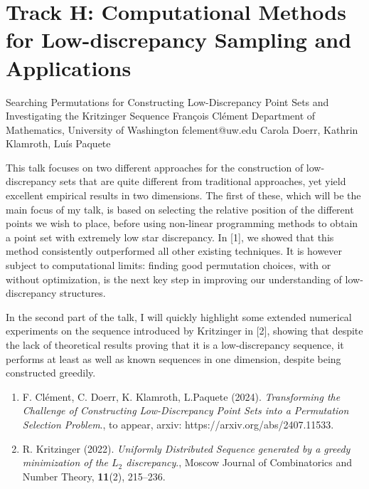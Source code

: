 \section{Track H: Computational Methods for Low-discrepancy Sampling and Applications}\newpage

\begin{talk}
  {Searching Permutations for Constructing Low-Discrepancy Point Sets and Investigating the Kritzinger Sequence}%
  {Fran\c{c}ois Cl\'{e}ment}%
  {Department of Mathematics, University of Washington}%
  {fclement@uw.edu}%
  {Carola Doerr, Kathrin Klamroth, Lu\'is Paquete}%
  
    
   
This talk focuses on two different approaches for the construction of low-discrepancy sets that are quite different from traditional approaches, yet yield excellent empirical results in two dimensions. The first of these, which will be the main focus of my talk, is based on selecting the relative position of the different points we wish to place, before using non-linear programming methods to obtain a point set with extremely low star discrepancy. In [1], we showed that this method consistently outperformed all other existing techniques. It is however subject to computational limits: finding good permutation choices, with or without optimization, is the next key step in improving our understanding of low-discrepancy structures.

In the second part of the talk, I will quickly highlight some extended numerical experiments on the sequence introduced by Kritzinger in [2], showing that despite the lack of theoretical results proving that it is a low-discrepancy sequence, it performs at least as well as known sequences in one dimension, despite being constructed greedily. 

\medskip

\begin{enumerate}
 \item[{[1]}] F. Cl\'ement, C. Doerr, K. Klamroth, L.Paquete (2024). {\it Transforming the Challenge of Constructing Low-Discrepancy Point Sets into a Permutation Selection Problem}., to appear, arxiv: https://arxiv.org/abs/2407.11533.
 \item[{[2]}] R. Kritzinger (2022).  {\it Uniformly Distributed Sequence generated by a greedy minimization of the $L_2$ discrepancy}., Moscow Journal of Combinatorics and Number Theory, \textbf{11}(2), 215--236.
\end{enumerate}

\end{talk}

